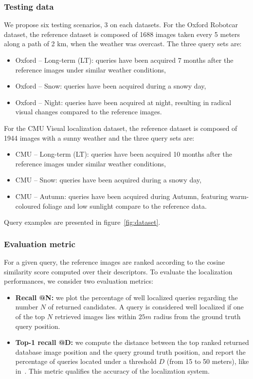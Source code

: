 \subsubsection{Testing data}
We propose six testing scenarios, 3 on each datasets. For the Oxford Robotcar dataset, the reference dataset is composed of 1688 images taken every 5 meters along a path of 2 km, when the weather was overcast. The three query sets are:
\begin{itemize}
	\item {Oxford -- Long-term (LT):} queries have been acquired 7 months after the reference images under similar weather conditions,
	\item {Oxford -- Snow:} queries have been acquired during a snowy day,
	\item {Oxford -- Night:} queries have been acquired at night, resulting in radical visual changes compared to the reference images.
\end{itemize}

For the CMU Visual localization dataset, the reference dataset is composed of 1944 images with a sunny weather and the three query sets are:
\begin{itemize}
	\item {CMU -- Long-term (LT):} queries have been acquired 10 months after the reference images under similar weather conditions,
	\item {CMU -- Snow:} queries have been acquired during a snowy day,
	\item {CMU -- Autumn:} queries have been acquired during Autumn, featuring warm-coloured foliage and low sunlight compare to the reference data.
\end{itemize}

\noindent Query examples are presented in figure~\ref{fig:dataset}.
	
\subsubsection{Evaluation metric}
For a given query, the reference images are ranked according to the cosine similarity score computed over their descriptors. To evaluate the localization performances, we consider two evaluation metrics:
\begin{itemize}
	\item \textbf{Recall @N:} we plot the percentage of well localized queries regarding the number $N$ of returned candidates. A query is considered well localized if one of the top $N$ retrieved images lies within $25m$ radius from the ground truth query position.
	\item \textbf{Top-1 recall @D:} we compute the distance between the top ranked returned database image position and the query ground truth position, and report the percentage of queries located under a threshold $D$ (from 15 to 50 meters), like in~\cite{Zamir2014}. This metric qualifies the accuracy of the localization system.
\end{itemize}


